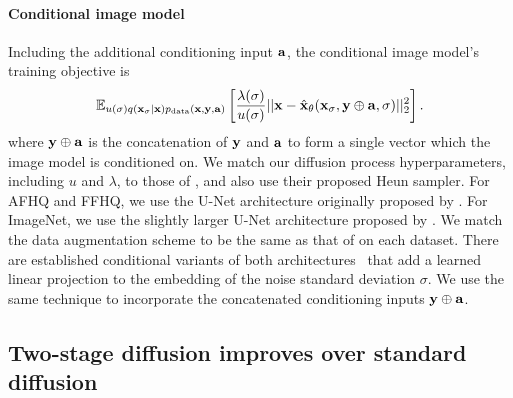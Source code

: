 \paragraph{Conditional image model}
Including the additional conditioning input ${\mathbf{a}}$, the conditional image model's training objective is
\begin{equation}
\label{eq:conditional-image-model-objective}
    \mathbb{E}_{u(\sigma)q({\mathbf{x}}_\sigma|{\mathbf{x}})p_{\rm{data}}({\mathbf{x}},{\mathbf{y}},{\mathbf{a}})} \left[ \frac{\lambda(\sigma)}{u(\sigma)} \lvert\lvert {\mathbf{x}} - \hat{{\mathbf{x}}}_\theta({\mathbf{x}}_\sigma, {\mathbf{y}} \oplus {\mathbf{a}}, \sigma) \rvert\rvert_2^2 \right].
\end{equation}
where ${\mathbf{y}} \oplus {\mathbf{a}}$ is the concatenation of ${\mathbf{y}}$ and ${\mathbf{a}}$ to form a single vector which the image model is conditioned on. We match our diffusion process hyperparameters, including $u$ and $\lambda$, to those of \citet{karras2022elucidating}, and also use their proposed Heun sampler.  For AFHQ and FFHQ, we use the U-Net architecture originally proposed by \citet{song2020score}. For ImageNet, we use the slightly larger U-Net architecture proposed by \citet{dhariwal2021diffusion}. We match the data augmentation scheme to be the same as that of \citet{karras2022elucidating} on each dataset. There are established conditional variants of both architectures~\citep{dhariwal2021diffusion,karras2022elucidating} that add a learned linear projection to the embedding of the noise standard deviation $\sigma$.  We use the same technique to incorporate the concatenated conditioning inputs ${\mathbf{y}}\oplus{\mathbf{a}}$.

\subsection{Two-stage diffusion improves over standard diffusion} \label{sec:2sdm-experiments}


